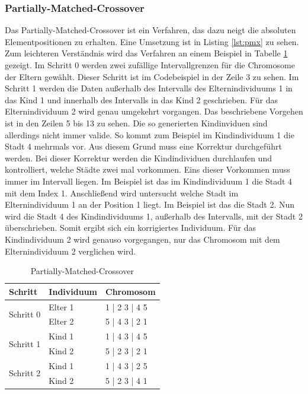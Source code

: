 \subsubsection{Partially-Matched-Crossover}

Das Partially-Matched-Crossover ist ein Verfahren, das dazu neigt die absoluten Elementpositionen zu erhalten. Eine Umsetzung ist in Listing \ref{lst:pmx} zu sehen. Zum leichteren Verständnis wird das Verfahren an einem Beispiel in Tabelle \ref{tab:pmx} gezeigt.
Im Schritt 0 werden zwei zufällige Intervallgrenzen für die Chromosome der Eltern gewählt. Dieser Schritt ist im Codebeispiel in der Zeile 3 zu sehen.
Im Schritt 1 werden die Daten außerhalb des Intervalls des Elternindividuums 1 in das Kind 1 und innerhalb des Intervalls in das Kind 2 geschrieben. Für das Elternindividuum 2 wird genau umgekehrt vorgangen. Das beschriebene Vorgehen ist in den Zeilen 5 bis 13 zu sehen.
Die so generierten Kindinviduen sind allerdings nicht immer valide. So kommt zum Beispiel im Kindindividuum 1 die Stadt 4 mehrmals vor. Aus diesem Grund muss eine Korrektur durchgeführt werden.
Bei dieser Korrektur werden die Kindindividuen durchlaufen und kontrolliert, welche Städte zwei mal vorkommen. Eins dieser Vorkommen muss immer im Intervall liegen. Im Beispiel ist das im Kindindividuum 1 die Stadt 4 mit dem Index 1. Anschließend wird untersucht welche Stadt im Elternindividuum 1 an der Position 1 liegt. Im Beispiel ist das die Stadt 2. Nun wird die Stadt 4 des Kindindividuums 1, außerhalb des Intervalls, mit der Stadt 2 überschrieben. Somit ergibt sich ein korrigiertes Individuum. Für das Kindindividuum 2 wird genauso vorgegangen, nur das Chromosom mit dem Elternindividuum 2 verglichen wird.
\begin{table}[H]
\caption{Partially-Matched-Crossover}
\begin{tabularx}{\textwidth}{l|l|l}
Schritt & Individuum & Chromosom\\
\hline
\multirow{2}{*}{Schritt 0}
		& Elter 1 & 1 | 2 3 | 4 5\\
		&  Elter 2 & 5 | 4 3 | 2 1\\
\hline
\multirow{2}{*}{Schritt 1}
		& Kind 1 &  1 | 4 3 | 4 5\\
		&  Kind 2 & 5 | 2 3 | 2 1\\
\hline
\multirow{2}{*}{Schritt 2}
		& Kind 1 &  1 | 4 3 | 2 5\\
		&  Kind 2 & 5 | 2 3 | 4 1\\
\end{tabularx}
\label{tab:pmx}
\end{table}

